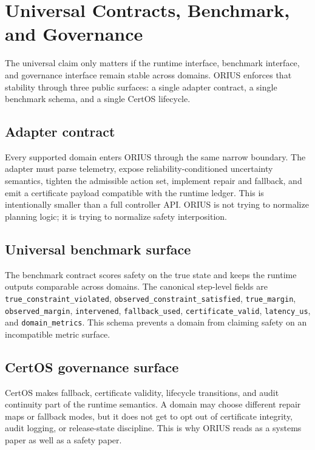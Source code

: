 \section{Universal Contracts, Benchmark, and Governance}
\label{sec:ieee-contracts}

The universal claim only matters if the runtime interface, benchmark interface, and
governance interface remain stable across domains. ORIUS enforces that stability
through three public surfaces: a single adapter contract, a single benchmark schema,
and a single CertOS lifecycle.

\subsection{Adapter contract}
Every supported domain enters ORIUS through the same narrow boundary. The adapter must
parse telemetry, expose reliability-conditioned uncertainty semantics, tighten the
admissible action set, implement repair and fallback, and emit a certificate payload
compatible with the runtime ledger. This is intentionally smaller than a full controller
API. ORIUS is not trying to normalize planning logic; it is trying to normalize safety
interposition.

\subsection{Universal benchmark surface}
The benchmark contract scores safety on the true state and keeps the runtime outputs
comparable across domains. The canonical step-level fields are
\texttt{true\_constraint\_violated}, \texttt{observed\_constraint\_satisfied},
\texttt{true\_margin}, \texttt{observed\_margin}, \texttt{intervened},
\texttt{fallback\_used}, \texttt{certificate\_valid}, \texttt{latency\_us}, and
\texttt{domain\_metrics}. This schema prevents a domain from claiming safety on an
incompatible metric surface.

\subsection{CertOS governance surface}
CertOS makes fallback, certificate validity, lifecycle transitions, and audit continuity
part of the runtime semantics. A domain may choose different repair maps or fallback
modes, but it does not get to opt out of certificate integrity, audit logging, or
release-state discipline. This is why ORIUS reads as a systems paper as well as a
safety paper.

